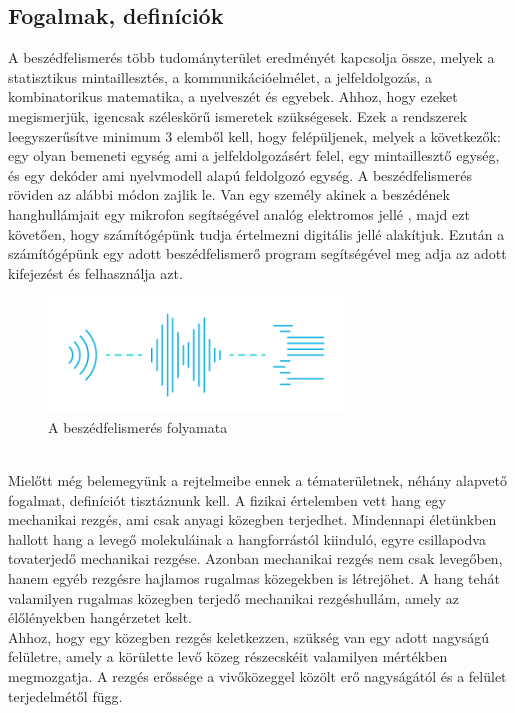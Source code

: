 \documentclass[a4paper,12pt]{paper}
\begin{document}
\subsection{Fogalmak, definíciók}

A beszédfelismerés több tudományterület eredményét kapcsolja össze, melyek a statisztikus mintaillesztés, a kommunikációelmélet, a jelfeldolgozás, a kombinatorikus matematika, a nyelveszét és egyebek. Ahhoz, hogy ezeket megismerjük, igencsak széleskörű ismeretek szükségesek. Ezek a rendszerek leegyszerűsítve minimum 3 elemből kell, hogy felépüljenek, melyek a következők: egy olyan bemeneti egység ami a jelfeldolgozásért felel, egy mintaillesztő egység, és egy dekóder ami nyelvmodell alapú feldolgozó egység. A beszédfelismerés röviden az alábbi módon zajlik le. Van egy személy akinek a beszédének hanghullámjait egy mikrofon segítségével analóg elektromos jellé , majd ezt követően, hogy számítógépünk tudja értelmezni digitális jellé alakítjuk. Ezután a számítógépünk egy adott  beszédfelismerő program segítségével meg adja az adott kifejezést és felhasználja azt.
\begin{figure}[h]

	\centering
	\includegraphics[width=0.7\textwidth]{amazonsr}
	\caption{A beszédfelismerés folyamata}
\end{figure}
\\Mielőtt még belemegyünk a rejtelmeibe ennek a tématerületnek, néhány alapvető fogalmat, definíciót tisztáznunk kell. A fizikai értelemben vett hang egy mechanikai rezgés, ami csak anyagi közegben terjedhet. Mindennapi életünkben hallott hang a levegő molekuláinak a hangforrástól kiinduló, egyre csillapodva tovaterjedő mechanikai rezgése. Azonban mechanikai rezgés nem csak levegőben, hanem egyéb rezgésre hajlamos rugalmas közegekben is létrejöhet. A hang tehát valamilyen rugalmas közegben terjedő mechanikai rezgéshullám, amely az élőlényekben hangérzetet kelt. 
\\Ahhoz, hogy egy közegben rezgés keletkezzen, szükség van egy adott nagyságú felületre, amely a körülette levő közeg részecskéit valamilyen mértékben megmozgatja. A rezgés erőssége a vivőközeggel közölt erő nagyságától és a felület terjedelmétől függ.
\end{document}
